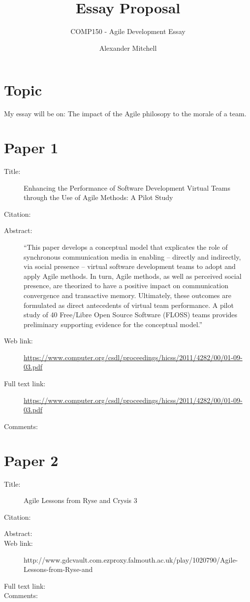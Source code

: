 \documentclass{scrartcl}
\title{Essay Proposal}
\subtitle{COMP150 - Agile Development Essay}
\author{Alexander Mitchell}
\begin{document}
\maketitle

\section*{Topic}

My essay will be on: The impact of the Agile philosopy to the morale of a team.


\section*{Paper 1}
\begin{description}
\item[Title:] Enhancing the Performance of Software Development Virtual Teams through the Use of Agile Methods: A Pilot Study
\item[Citation:] \cite{bibtex_key}
\item[Abstract:] ``This paper develops a conceptual model that
explicates the role of synchronous communication
media in enabling – directly and indirectly, via social
presence – virtual software development teams to
adopt and apply Agile methods. In turn, Agile
methods, as well as perceived social presence, are
theorized to have a positive impact on
communication convergence and transactive
memory. Ultimately, these outcomes are formulated
as direct antecedents of virtual team performance. A
pilot study of 40 Free/Libre Open Source Software
(FLOSS) teams provides preliminary supporting
evidence for the conceptual model.''
\item[Web link:] \url{https://www.computer.org/csdl/proceedings/hicss/2011/4282/00/01-09-03.pdf}
\item[Full text link:] \url{https://www.computer.org/csdl/proceedings/hicss/2011/4282/00/01-09-03.pdf}
\item[Comments:]
\end{description}

\section*{Paper 2}
\begin{description}
\item[Title:] Agile Lessons from Ryse and Crysis 3
\item[Citation:] \cite{bibtex_key}
\item[Abstract:] 
\item[Web link:] http://www.gdcvault.com.ezproxy.falmouth.ac.uk/play/1020790/Agile-Lessons-from-Ryse-and
\item[Full text link:] 
\item[Comments:] 
\end{description}
\end{document}
